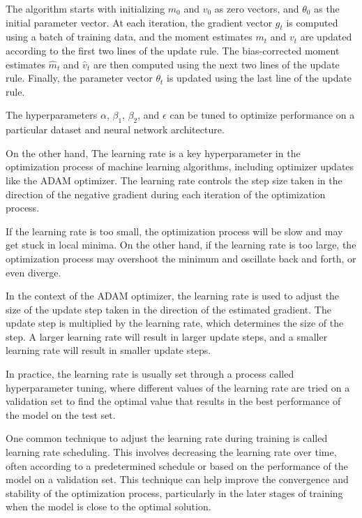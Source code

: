 The algorithm starts with initializing $m_0$ and $v_0$ as zero vectors, and $\theta_0$ as the initial parameter vector. At each iteration, the gradient vector $g_t$ is computed using a batch of training data, and the moment estimates $m_t$ and $v_t$ are updated according to the first two lines of the update rule. The bias-corrected moment estimates $\hat{m}_t$ and $\hat{v}_t$ are then computed using the next two lines of the update rule. Finally, the parameter vector $\theta_t$ is updated using the last line of the update rule.

The hyperparameters $\alpha$, $\beta_1$, $\beta_2$, and $\epsilon$ can be tuned to optimize performance on a particular dataset and neural network architecture.

On the other hand, The learning rate is a key hyperparameter in the optimization process of machine learning algorithms, including optimizer updates like the ADAM optimizer. The learning rate controls the step size taken in the direction of the negative gradient during each iteration of the optimization process.

If the learning rate is too small, the optimization process will be slow and may get stuck in local minima. On the other hand, if the learning rate is too large, the optimization process may overshoot the minimum and oscillate back and forth, or even diverge.

In the context of the ADAM optimizer, the learning rate is used to adjust the size of the update step taken in the direction of the estimated gradient. The update step is multiplied by the learning rate, which determines the size of the step. A larger learning rate will result in larger update steps, and a smaller learning rate will result in smaller update steps.

In practice, the learning rate is usually set through a process called hyperparameter tuning, where different values of the learning rate are tried on a validation set to find the optimal value that results in the best performance of the model on the test set.

One common technique to adjust the learning rate during training is called learning rate scheduling. This involves decreasing the learning rate over time, often according to a predetermined schedule or based on the performance of the model on a validation set. This technique can help improve the convergence and stability of the optimization process, particularly in the later stages of training when the model is close to the optimal solution.

